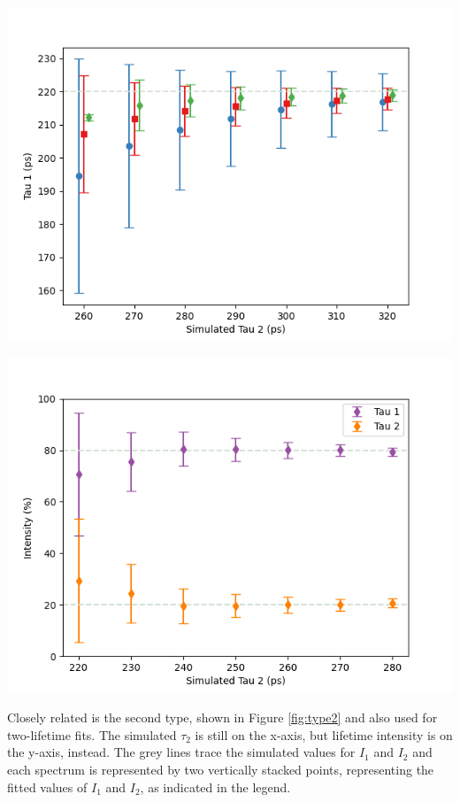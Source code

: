 \begin{minipage}{0.46\textwidth}
     
    \includegraphics[width=\textwidth]{Batch 3/regular IRF/tau1 220/output/t1.png}
    \label{fig:type1}
\end{minipage}
\hfill
\begin{minipage}{0.46\textwidth}
     
    \includegraphics[width=\textwidth]{Batch 1+2/8020.png}
    \label{fig:type2}
\end{minipage}

Closely related is the second type, shown in Figure \ref{fig:type2} and also used for two-lifetime fits. The simulated $\tau_2$ is still on the x-axis, but lifetime intensity is on the y-axis, instead. The grey lines trace the simulated values for $I_1$ and $I_2$ and each spectrum is represented by two vertically stacked points, representing the fitted values of $I_1$ and $I_2$, as indicated in the legend.


